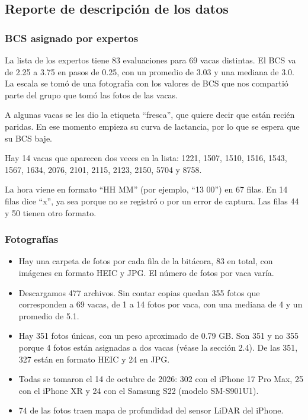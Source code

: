 \subsection{Reporte de descripción de los datos}

\subsubsection*{BCS asignado por expertos}

La lista de los expertos tiene 83 evaluaciones para 69 vacas distintas. El BCS va de 2.25 a 3.75 en pasos de 0.25, con un promedio de 3.03 y una mediana de 3.0. La escala se tomó de una fotografía con los valores de BCS que nos compartió parte del grupo que tomó las fotos de las vacas.

A algunas vacas se les dio la etiqueta ``fresca'', que quiere decir que están recién paridas. En ese momento empieza su curva de lactancia, por lo que se espera que su BCS baje.

Hay 14 vacas que aparecen dos veces en la lista: 1221, 1507, 1510, 1516, 1543, 1567, 1634, 2076, 2101, 2115, 2123, 2150, 5704 y 8758.

La hora viene en formato ``HH MM'' (por ejemplo, ``13 00'') en 67 filas. En 14 filas dice ``x'', ya sea porque no se registró o por un error de captura. Las filas 44 y 50 tienen otro formato.

\subsubsection*{Fotografías}

\begin{itemize}
  \item Hay una carpeta de fotos por cada fila de la bitácora, 83 en total, con imágenes en formato HEIC y JPG. El número de fotos por vaca varía.
  \item Descargamos 477 archivos. Sin contar copias quedan 355 fotos que corresponden a 69 vacas, de 1 a 14 fotos por vaca, con una mediana de 4 y un promedio de 5.1.
  \item Hay 351 fotos únicas, con un peso aproximado de 0.79 GB. Son 351 y no 355 porque 4 fotos están asignadas a dos vacas (véase la sección 2.4). De las 351, 327 están en formato HEIC y 24 en JPG.
  \item Todas se tomaron el 14 de octubre de 2026: 302 con el iPhone 17 Pro Max, 25 con el iPhone XR y 24 con el Samsung S22 (modelo SM-S901U1).
  \item 74 de las fotos traen mapa de profundidad del sensor LiDAR del iPhone.
\end{itemize}

